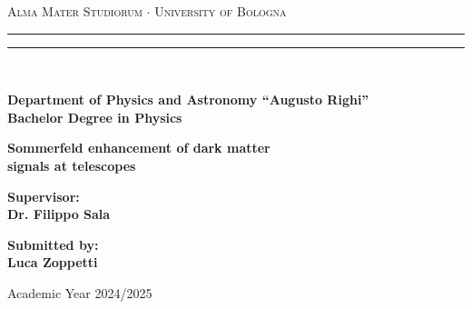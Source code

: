 \begin{titlepage}
\begin{center}
{{\Large{\textsc{Alma Mater Studiorum $\cdot$ University of Bologna}}}} 
\rule[0.1cm]{15.8cm}{0.1mm}
\rule[0.5cm]{15.8cm}{0.6mm}
\\\vspace{3mm}

{\small{\bf Department of Physics and Astronomy “Augusto Righi”\\
Bachelor Degree in Physics}}

\end{center}

\vspace{23mm}

\begin{center}
{\LARGE{\bf Sommerfeld enhancement of dark matter\\[6pt]signals at telescopes}}\\
\end{center}

\vspace{50mm} \par \noindent

\begin{minipage}[t]{0.47\textwidth}
{\large{\bf Supervisor: \vspace{2mm}\\
Dr. Filippo Sala}}
\end{minipage}
%
\hfill
%
\begin{minipage}[t]{0.47\textwidth}\raggedleft
{\large{\bf Submitted by:
\vspace{2mm}\\
Luca Zoppetti}}
\end{minipage}

\vspace{40mm}

\begin{center}
Academic Year 2024/2025
\end{center}

\end{titlepage}